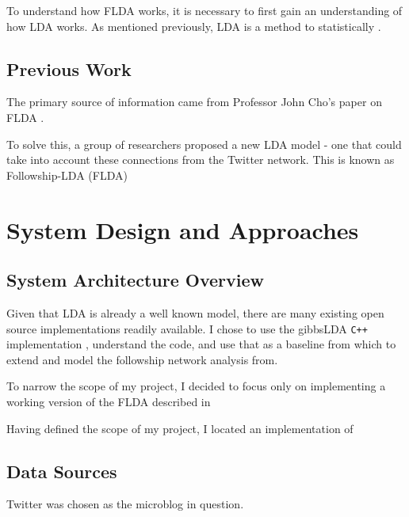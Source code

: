 \documentclass[a4paper]{article}
\begin{document}
\begin{multicols}{2}
To understand how FLDA works, it is necessary to first gain an understanding of how LDA works. As mentioned previously, LDA is a method to statistically 
\cite{lda}. 

\subsection{Previous Work}
The primary source of information came from Professor John Cho's paper on FLDA \cite{flda}. 

To solve this, a group of researchers proposed a new LDA model - one that could take into account these connections from the Twitter network. This is known as Followship-LDA (FLDA)

\section{System Design and Approaches}
\label{sec:approach}
\subsection{System Architecture Overview}
Given that LDA is already a well known model, there are many existing open source implementations readily available. I chose to use the gibbsLDA \verb!C++! implementation \cite{gibbs_lda}, understand the code, and use that as a baseline from which to extend and model the followship network analysis from. 

To narrow the scope of my project, I decided to focus only on implementing a working version of the FLDA described in 

Having defined the scope of my project, I 
located an implementation of  \cite{gibbs_lda}

\subsection{Data Sources}
Twitter was chosen as the microblog in question.


\end{multicols}
\end{document}
